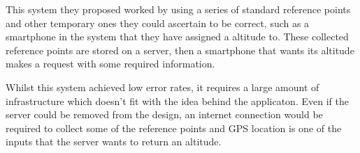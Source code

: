 \documentclass[main.tex]{subfiles}
\begin{document}
This system they proposed worked by using a series of standard reference points and other temporary ones they could ascertain to be correct, such as a smartphone in the system that they have assigned a altitude to. These collected reference points are stored on a server, then a smartphone that wants its altitude makes a request with some required information.

Whilst this system achieved low error rates, it requires a large amount of infrastructure which doesn't fit with the idea behind the applicaton. Even if the server could be removed from the design, an internet connection would be required to collect some of the reference points and GPS location is one of the inputs that the server wants to return an altitude.

\nocite{*}
\end{document}
